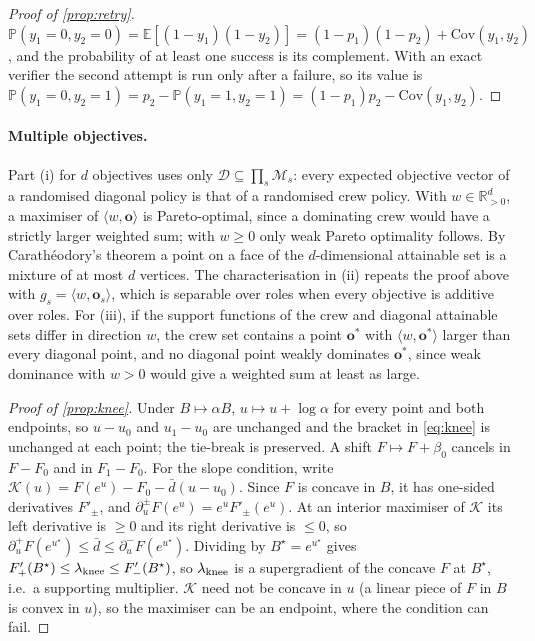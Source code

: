 \documentclass[11pt,a4paper]{article}
\theoremstyle{definition}
\theoremstyle{remark}
\theoremstyle{definition}
\newcommand{\E}{\mathbb{E}}
\newcommand{\R}{\mathbb{R}}
\renewcommand{\Pr}{\mathbb{P}}
\newcommand{\mods}{\mathcal{M}}
\begin{document}
\begin{proof}[Proof of \cref{prop:retry}]
$\Pr(y_1=0,y_2=0)=\E[(1-y_1)(1-y_2)]=(1-p_1)(1-p_2)+\mathrm{Cov}(y_1,y_2)$, and the probability of at least one success is its complement. With an exact verifier the second attempt is run only after a failure, so its value is $\Pr(y_1=0,y_2=1)=p_2-\Pr(y_1=1,y_2=1)=(1-p_1)p_2-\mathrm{Cov}(y_1,y_2)$.
\end{proof}

\paragraph{Multiple objectives.} Part (i) for $d$ objectives uses only $\mathcal D\subseteq\prod_s\mods_s$: every expected objective vector of a randomised diagonal policy is that of a randomised crew policy. With $w\in\R^d_{>0}$, a maximiser of $\langle w,\mathbf o\rangle$ is Pareto-optimal, since a dominating crew would have a strictly larger weighted sum; with $w\ge0$ only weak Pareto optimality follows. By Carath\'eodory's theorem a point on a face of the $d$-dimensional attainable set is a mixture of at most $d$ vertices. The characterisation in (ii) repeats the proof above with $g_s=\langle w,\mathbf o_s\rangle$, which is separable over roles when every objective is additive over roles. For (iii), if the support functions of the crew and diagonal attainable sets differ in direction $w$, the crew set contains a point $\mathbf o^\ast$ with $\langle w,\mathbf o^\ast\rangle$ larger than every diagonal point, and no diagonal point weakly dominates $\mathbf o^\ast$, since weak dominance with $w>0$ would give a weighted sum at least as large.

\begin{proof}[Proof of \cref{prop:knee}]
Under $B\mapsto\alpha B$, $u\mapsto u+\log\alpha$ for every point and both endpoints, so $u-u_0$ and $u_1-u_0$ are unchanged and the bracket in \eqref{eq:knee} is unchanged at each point; the tie-break is preserved. A shift $F\mapsto F+\beta_0$ cancels in $F-F_0$ and in $F_1-F_0$. For the slope condition, write $\mathcal K(u)=F(e^u)-F_0-\bar d(u-u_0)$. Since $F$ is concave in $B$, it has one-sided derivatives $F'_\pm$, and $\partial_u^\pm F(e^u)=e^uF'_\pm(e^u)$. At an interior maximiser of $\mathcal K$ its left derivative is $\ge0$ and its right derivative is $\le0$, so $\partial_u^+F(e^{u^\star})\le\bar d\le\partial_u^-F(e^{u^\star})$. Dividing by $B^\star=e^{u^\star}$ gives $F'_+(B^\star)\le\lambda_{\rm knee}\le F'_-(B^\star)$, so $\lambda_{\rm knee}$ is a supergradient of the concave $F$ at $B^\star$, i.e.\ a supporting multiplier. $\mathcal K$ need not be concave in $u$ (a linear piece of $F$ in $B$ is convex in $u$), so the maximiser can be an endpoint, where the condition can fail.
\end{proof}
\end{document}
